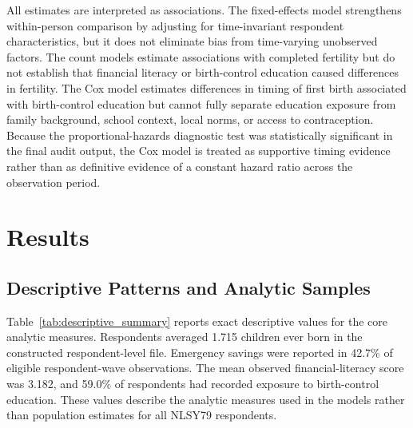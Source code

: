 \documentclass[12pt]{article}
\begin{document}
All estimates are interpreted as associations. The fixed-effects model strengthens within-person comparison by adjusting for time-invariant respondent characteristics, but it does not eliminate bias from time-varying unobserved factors. The count models estimate associations with completed fertility but do not establish that financial literacy or birth-control education caused differences in fertility. The Cox model estimates differences in timing of first birth associated with birth-control education but cannot fully separate education exposure from family background, school context, local norms, or access to contraception. Because the proportional-hazards diagnostic test was statistically significant in the final audit output, the Cox model is treated as supportive timing evidence rather than as definitive evidence of a constant hazard ratio across the observation period.


\section{Results}

\subsection{Descriptive Patterns and Analytic Samples}

Table~\ref{tab:descriptive_summary} reports exact descriptive values for the core analytic measures. Respondents averaged 1.715 children ever born in the constructed respondent-level file. Emergency savings were reported in 42.7\% of eligible respondent-wave observations. The mean observed financial-literacy score was 3.182, and 59.0\% of respondents had recorded exposure to birth-control education. These values describe the analytic measures used in the models rather than population estimates for all NLSY79 respondents.
\end{document}
